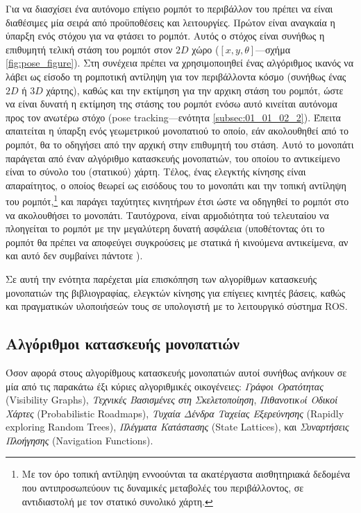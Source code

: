 Για να διασχίσει ένα αυτόνομο επίγειο ρομπότ το περιβάλλον του πρέπει να είναι
διαθέσιμες μία σειρά από προϋποθέσεις και λειτουργίες. Πρώτον είναι αναγκαία η
ύπαρξη ενός στόχου για να φτάσει το ρομπότ. Αυτός ο στόχος είναι συνήθως η
επιθυμητή τελική στάση του ρομπότ στον $2D$ χώρο ($[x, y, \theta]$---σχήμα
\ref{fig:pose_figure}). Στη συνέχεια πρέπει να χρησιμοποιηθεί ένας αλγόριθμος
ικανός να λάβει ως είσοδο τη ρομποτική αντίληψη για τον περιβάλλοντα κόσμο
(συνήθως ένας $2D$ ή $3D$ χάρτης), καθώς και την εκτίμηση για την αρχικη στάση
του ρομπότ, ώστε να είναι δυνατή η εκτίμηση της στάσης του ρομπότ ενόσω αυτό
κινείται αυτόνομα προς τον ανωτέρω στόχο (pose tracking---ενότητα
\ref{subsec:01_01_02_2}).  Έπειτα απαιτείται η ύπαρξη ενός γεωμετρικού
μονοπατιού το οποίο, εάν ακολουθηθεί από το ρομπότ, θα το οδηγήσει από την
αρχική στην επιθυμητή του στάση. Αυτό το μονοπάτι παράγεται από έναν αλγόριθμο
κατασκευής μονοπατιών, του οποίου το αντικείμενο είναι το σύνολο του (στατικού)
χάρτη. Τέλος, ένας ελεγκτής κίνησης είναι απαραίτητος, ο οποίος θεωρεί ως
εισόδους του το μονοπάτι και την τοπική αντίληψη του ρομπότ,\footnote{Με τον
όρο τοπική αντίληψη εννοούνται τα ακατέργαστα αισθητηριακά δεδομένα που
αντιπροσωπεύουν τις δυναμικές μεταβολές του περιβάλλοντος, σε αντιδιαστολή με
τον στατικό συνολικό χάρτη.} και παράγει ταχύτητες κινητήρων έτσι ώστε να
οδηγηθεί το ρομπότ στο να ακολουθήσει το μονοπάτι. Ταυτόχρονα, είναι
αρμοδιότητα τού τελευταίου να πλοηγείται το ρομπότ με την μεγαλύτερη δυνατή
ασφάλεια (υποθέτοντας ότι το ρομπότ θα πρέπει να αποφεύγει συγκρούσεις με
στατικά ή κινούμενα αντικείμενα, αν και αυτό δεν συμβαίνει πάντοτε
\cite{Gandhi2017}).

Σε αυτή την ενότητα παρέχεται μία επισκόπηση των αλγορίθμων κατασκευής
μονοπατιών της βιβλιογραφίας, ελεγκτών κίνησης για επίγειες κινητές βάσεις,
καθώς και πραγματικών υλοποιήσεών τους σε υπολογιστή με το λειτουργικό σύστημα
ROS.

\subsection{Αλγόριθμοι κατασκευής μονοπατιών}
\label{subsection:02_01_02:01}

Όσον αφορά στους αλγορίθμους κατασκευής μονοπατιών αυτοί συνήθως ανήκουν σε
μία από τις παρακάτω έξι κύριες αλγοριθμικές οικογένειες: \textit{Γράφοι
Ορατότητας} (Visibility Graphs), \textit{Τεχνικές Βασισμένες στη
Σκελετοποίηση}, \textit{Πιθανοτικoί Οδικοί Χάρτες} (Probabilistic Roadmaps),
\textit{Τυχαία Δένδρα Ταχείας Εξερεύνησης} (Rapidly exploring Random Trees),
\textit{Πλέγματα Κατάστασης} (State Lattices), και \textit{Συναρτήσεις
Πλοήγησης} (Navigation Functions).

